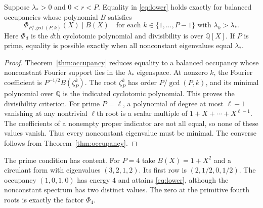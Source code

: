 \documentclass[11pt,a4paper]{article}
\begin{document}
\begin{proposition}\label{prop:cyclotomic}
Suppose $\lambda_*>0$ and $0<r<P$. Equality in
\eqref{eq:lower} holds exactly for balanced occupancies whose polynomial
$B$ satisfies
\[
 \Phi_{P/\gcd(P,k)}(X)\mid B(X)
 \quad\text{for each }k\in\{1,\ldots,P-1\}
 \text{ with }\lambda_k>\lambda_*.
\]
Here $\Phi_d$ is the $d$th cyclotomic polynomial and divisibility is over
$\mathbb Q[X]$. If $P$ is prime, equality is possible exactly when all
nonconstant eigenvalues equal $\lambda_*$.
\end{proposition}
\begin{proof}
Theorem~\ref{thm:occupancy} reduces equality to a balanced occupancy whose
nonconstant Fourier support lies in the $\lambda_*$ eigenspace.
At nonzero $k$, the Fourier coefficient is $P^{-1/2}B(\zeta_P^k)$.
The root $\zeta_P^k$ has order $P/\gcd(P,k)$, and its minimal polynomial
over $\mathbb Q$ is the indicated cyclotomic polynomial. This proves the
divisibility criterion. For prime $P=\ell$, a polynomial of degree at
most $\ell-1$ vanishing at any nontrivial $\ell$th root is a scalar
multiple of $1+X+\cdots+X^{\ell-1}$. The coefficients of a nonempty proper
indicator are not all equal, so none of these values vanish. Thus every
nonconstant eigenvalue must be minimal. The converse follows from
Theorem~\ref{thm:occupancy}.
\end{proof}

The prime condition has content. For $P=4$ take $B(X)=1+X^2$ and a
circulant form with eigenvalues $(3,2,1,2)$. Its first row is
$(2,1/2,0,1/2)$. The occupancy $(1,0,1,0)$ has energy $4$ and attains
\eqref{eq:lower}, although the nonconstant spectrum has two distinct values.
The zero at the primitive fourth roots is exactly the factor $\Phi_4$.
\end{document}
